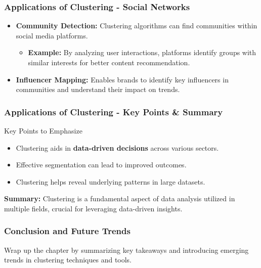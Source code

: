 \documentclass{beamer}
\begin{document}
\begin{frame}[fragile]
    \frametitle{Applications of Clustering - Social Networks}
    \begin{itemize}
        \item \textbf{Community Detection:} 
        Clustering algorithms can find communities within social media platforms.
        \begin{itemize}
            \item \textbf{Example:} By analyzing user interactions, platforms identify groups with similar interests for better content recommendation.
        \end{itemize}
        
        \item \textbf{Influencer Mapping:} 
        Enables brands to identify key influencers in communities and understand their impact on trends.
    \end{itemize}
\end{frame}

\begin{frame}[fragile]
    \frametitle{Applications of Clustering - Key Points & Summary}
    \begin{block}{Key Points to Emphasize}
        \begin{itemize}
            \item Clustering aids in \textbf{data-driven decisions} across various sectors.
            \item Effective segmentation can lead to improved outcomes.
            \item Clustering helps reveal underlying patterns in large datasets.
        \end{itemize}
    \end{block}
    
    \textbf{Summary:} Clustering is a fundamental aspect of data analysis utilized in multiple fields, crucial for leveraging data-driven insights.
\end{frame}

\begin{frame}
    \frametitle{Conclusion and Future Trends}
    Wrap up the chapter by summarizing key takeaways and introducing emerging trends in clustering techniques and tools.
\end{frame}
\end{document}
